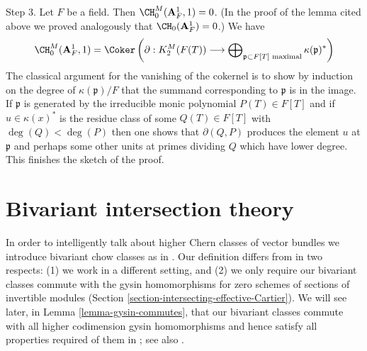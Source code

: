 \begin{remark}
\medskip\noindent
Step 3. Let $F$ be a field. Then $\CH^M_0(\mathbf{A}^1_F, 1) = 0$.
(In the proof of the lemma cited above we proved analogously that
$\CH_0(\mathbf{A}^1_F) = 0$.) We have
$$
\CH^M_0(\mathbf{A}^1_F, 1) = \Coker\left(
\partial : K^M_2(F(T)) \longrightarrow
\bigoplus\nolimits_{\mathfrak p \subset F[T]\text{ maximal}}
\kappa(\mathfrak p)^*\right)
$$
The classical argument for the vanishing of the cokernel is to
show by induction on the degree of $\kappa(\mathfrak p)/F$
that the summand corresponding to $\mathfrak p$ is in the image.
If $\mathfrak p$ is generated by the
irreducible monic polynomial $P(T) \in F[T]$ and if
$u \in \kappa(x)^*$ is the residue class of some
$Q(T) \in F[T]$ with $\deg(Q) < \deg(P)$ then one shows that
$\partial(Q, P)$ produces the element $u$ at $\mathfrak p$
and perhaps some other units at primes dividing $Q$ which
have lower degree. This finishes the sketch of the proof.
\end{remark}











\section{Bivariant intersection theory}
\label{section-bivariant}

\noindent
In order to intelligently talk about higher Chern classes of vector
bundles we introduce bivariant chow classes as in \cite{F}.
Our definition differs from \cite{F} in two respects:
(1) we work in a different setting, and (2) we only require
our bivariant classes commute with the gysin homomorphisms for
zero schemes of sections of invertible modules
(Section \ref{section-intersecting-effective-Cartier}).
We will see later, in Lemma \ref{lemma-gysin-commutes}, that our
bivariant classes commute with all higher codimension gysin homomorphisms
and hence satisfy all properties required of them in \cite{F}; see
also \cite[Theorem 17.1]{F}.

